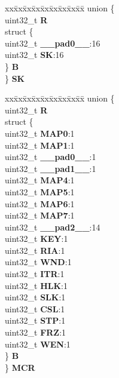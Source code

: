 \begin{DoxyCompactItemize}
\begin{tabbing}
\end{tabbing}\item 
\mbox{\label{structSWT__tag_ad2f4ac8446fe9694f8b1244472cb6699}} 
\begin{tabbing}
xx\=xx\=xx\=xx\=xx\=xx\=xx\=xx\=xx\=\kill
union \{\\
\>uint32\_t {\bfseries R}\\
\>struct \{\\
\>\>uint32\_t {\bfseries \_\_pad0\_\_}:16\\
\>\>uint32\_t {\bfseries SK}:16\\
\>\} {\bfseries B}\\
\} {\bfseries SK}\\

\end{tabbing}\item 
\mbox{\label{structSWT__tag_add439a69a0b2ffeae2cb33efafe807e9}} 
\begin{tabbing}
xx\=xx\=xx\=xx\=xx\=xx\=xx\=xx\=xx\=\kill
union \{\\
\>uint32\_t {\bfseries R}\\
\>struct \{\\
\>\>uint32\_t {\bfseries MAP0}:1\\
\>\>uint32\_t {\bfseries MAP1}:1\\
\>\>uint32\_t {\bfseries \_\_pad0\_\_}:1\\
\>\>uint32\_t {\bfseries \_\_pad1\_\_}:1\\
\>\>uint32\_t {\bfseries MAP4}:1\\
\>\>uint32\_t {\bfseries MAP5}:1\\
\>\>uint32\_t {\bfseries MAP6}:1\\
\>\>uint32\_t {\bfseries MAP7}:1\\
\>\>uint32\_t {\bfseries \_\_pad2\_\_}:14\\
\>\>uint32\_t {\bfseries KEY}:1\\
\>\>uint32\_t {\bfseries RIA}:1\\
\>\>uint32\_t {\bfseries WND}:1\\
\>\>uint32\_t {\bfseries ITR}:1\\
\>\>uint32\_t {\bfseries HLK}:1\\
\>\>uint32\_t {\bfseries SLK}:1\\
\>\>uint32\_t {\bfseries CSL}:1\\
\>\>uint32\_t {\bfseries STP}:1\\
\>\>uint32\_t {\bfseries FRZ}:1\\
\>\>uint32\_t {\bfseries WEN}:1\\
\>\} {\bfseries B}\\
\} {\bfseries MCR}\\


\end{tabbing}
\end{DoxyCompactItemize}
